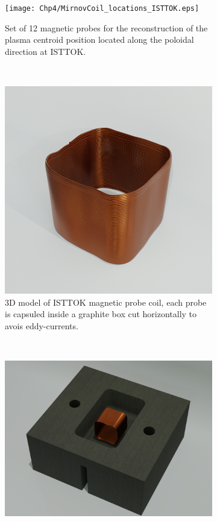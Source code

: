 \begin{figure}
	\centering
	\begin{subfigure}[b]{0.37\textwidth}
		\texttt{[image: Chp4/MirnovCoil\_locations\_ISTTOK.eps]}
		\caption{ Set of 12 magnetic probes for the reconstruction of the plasma centroid position located along the poloidal direction at ISTTOK.\label{MirnvC} }
	\end{subfigure}
	~~
	\begin{subfigure}[b]{0.37\textwidth}
		\includegraphics[width=\textwidth]{Chp4/mirn_coil.png}
		\caption{\label{MirnvC_photo} 3D model of ISTTOK magnetic probe coil, each probe is capsuled inside a graphite box cut horizontally to avois eddy-currents. }
	\end{subfigure}
~~
		\begin{subfigure}[b]{0.37\textwidth}
		\includegraphics[width=\textwidth]{Chp4/limiterBox.png}

\end{subfigure}
\end{figure}

